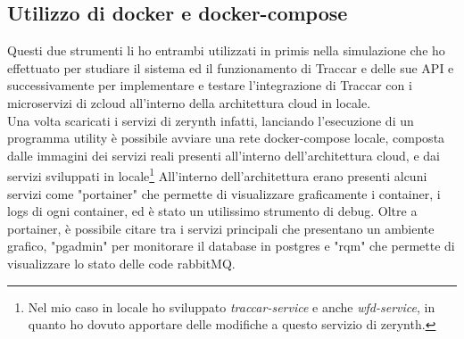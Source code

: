 \documentclass[a4paper,titlepage,12pt]{book}
\begin{document}
{\subsection{
Utilizzo di docker e docker-compose}
Questi due strumenti li ho entrambi utilizzati in primis nella simulazione che ho effettuato per studiare il sistema ed il funzionamento di Traccar e delle sue API e successivamente per implementare e testare l'integrazione di Traccar con i microservizi di zcloud all'interno della architettura cloud in locale. \\
Una volta scaricati i servizi di zerynth infatti, lanciando l'esecuzione di un programma utility è possibile avviare una rete docker-compose locale, composta dalle immagini dei servizi reali presenti all'interno dell'architettura cloud, e dai servizi sviluppati in locale\footnote{Nel mio caso in locale ho sviluppato \textit{traccar-service} e anche \textit{wfd-service}, in quanto ho dovuto apportare delle modifiche a questo servizio di zerynth.}
All'interno dell'architettura erano presenti alcuni servizi come "portainer" che permette di visualizzare graficamente i container, i logs di ogni container, ed è stato un utilissimo strumento di debug. Oltre a portainer, è possibile citare tra i servizi principali che presentano un ambiente grafico, "pgadmin" per monitorare il database in postgres e "rqm" che permette di visualizzare lo stato delle code rabbitMQ.


}
\end{document}
